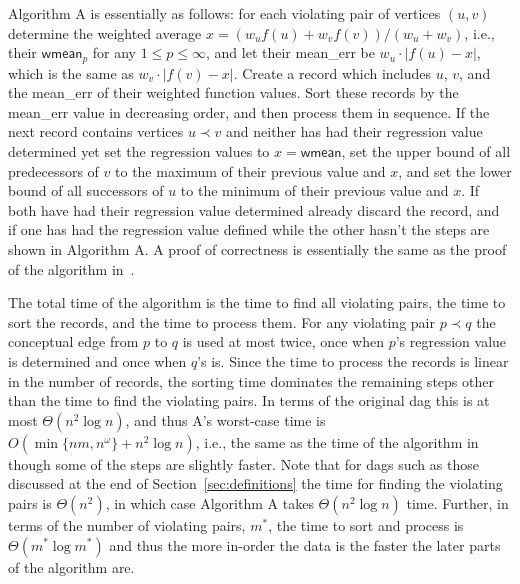 \documentclass[11pt]{article}
\begin{document}
Algorithm A is essentially as follows: for each violating pair of vertices $(u,v)$ determine the weighted average $x = (w_uf(u) + w_v f(v))/(w_u+w_v)$, i.e., their $\mathsf{wmean}_p$ for any $1 \leq p \leq \infty$, and let their
{\sffamily \small mean\_err} be $w_u \!\cdot\! |f(u)-x|$, which is the same as $w_v \!\cdot\! |f(v)-x|$. 
Create a record which includes $u$, $v$, and the {\sffamily \small mean\_err} of their weighted function values.
Sort these records by the {\sffamily \small mean\_err} value in decreasing order, and then process them in sequence.
If the next record contains vertices $u \prec v$ and neither has had their regression value determined yet set the regression values to $x = \mathsf{wmean}$, set the upper bound of all predecessors of $v$ to the maximum of their previous value and $x$, and set the lower bound of all successors of $u$ to the minimum of their previous value and $x$.
If both have had their regression value determined already discard the record, and if one has had the regression value defined while the other hasn't the steps are shown in Algorithm A.
A proof of correctness is essentially the same as the proof of the algorithm in~\cite{QStrictLinfty}.

The total time of the algorithm is the time to find all violating pairs, the time to sort the records, and the time to process them.
For any violating pair $p \prec q$ the conceptual edge from $p$ to $q$ is used at most twice, once when $p$'s regression value is determined and once when $q$'s is.
Since the time to process the records is linear in the number of records, the sorting time dominates the remaining steps other than the time to find the violating pairs.
In terms of the original dag this is at most $\Theta(n^2 \log n)$, and thus A's worst-case time is $O(\min\{nm,n^\omega\} + n^2 \log n)$, i.e.,  the same as the time of the algorithm in~\cite{QStrictLinfty} though some of the steps are slightly faster.
Note that for dags such as those discussed at the end of Section~\ref{sec:definitions} the time for finding the violating pairs is $\Theta(n^2)$, in which case Algorithm A takes $\Theta(n^2 \log n)$ time.
Further, in terms of the number of violating pairs, $m^*$, the time to sort and process is $\Theta(m^*\log m^*)$ and thus the more in-order the data is the faster the later parts of the algorithm are.
\end{document}
